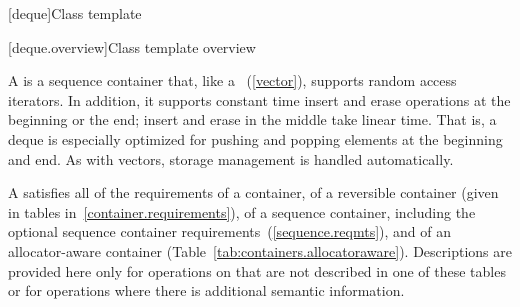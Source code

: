 [deque]{Class template }

[deque.overview]{Class template  overview}

\pnum
A
%
is a sequence container that, like a
~(\ref{vector}), supports random access iterators.
In addition, it supports constant time insert and erase operations at the beginning or the end;
insert and erase in the middle take linear time.
That is, a deque is especially optimized for pushing and popping elements at the beginning and end.
As with vectors, storage management is handled automatically.

\pnum
A
satisfies all of the requirements of a container, of a reversible container
(given in tables in~\ref{container.requirements}), of a sequence container,
including the optional sequence container requirements~(\ref{sequence.reqmts}), and of an allocator-aware container (Table~\ref{tab:containers.allocatoraware}).
Descriptions are provided here only for operations on
that are not described in one of these tables
or for operations where there is additional semantic information.

